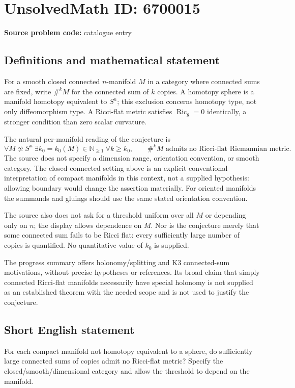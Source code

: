 \documentclass[11pt]{article}
\newcommand{\N}{\mathbb{N}}
\begin{document}
\section*{UnsolvedMath ID: 6700015}
\textbf{Source problem code:} catalogue entry
\subsection{Definitions and mathematical statement}
For a smooth closed connected $n$-manifold $M$ in a category where connected sums are fixed, write $\#^k M$ for the connected sum of $k$ copies. A homotopy sphere is a manifold homotopy equivalent to $S^n$; this exclusion concerns homotopy type, not only diffeomorphism type. A Ricci-flat metric satisfies $\operatorname{Ric}_g=0$ identically, a stronger condition than zero scalar curvature.

The natural per-manifold reading of the conjecture is
\[
\forall M\not\simeq S^n\ \exists k_0=k_0(M)\in\N_{\geq1}\ \forall k\geq k_0,
\qquad \#^k M\text{ admits no Ricci-flat Riemannian metric}.
\]
The source does not specify a dimension range, orientation convention, or smooth category. The closed connected setting above is an explicit conventional interpretation of compact manifolds in this context, not a supplied hypothesis: allowing boundary would change the assertion materially. For oriented manifolds the summands and gluings should use the same stated orientation convention.

The source also does not ask for a threshold uniform over all $M$ or depending only on $n$; the display allows dependence on $M$. Nor is the conjecture merely that some connected sum fails to be Ricci flat: every sufficiently large number of copies is quantified. No quantitative value of $k_0$ is supplied.

The progress summary offers holonomy/splitting and K3 connected-sum motivations, without precise hypotheses or references. Its broad claim that simply connected Ricci-flat manifolds necessarily have special holonomy is not supplied as an established theorem with the needed scope and is not used to justify the conjecture.
\subsection{Short English statement}
For each compact manifold not homotopy equivalent to a sphere, do sufficiently large connected sums of copies admit no Ricci-flat metric? Specify the closed/smooth/dimensional category and allow the threshold to depend on the manifold.
\end{document}

